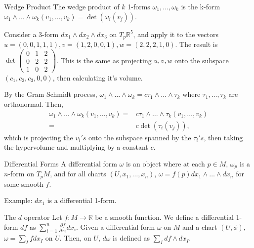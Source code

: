 \documentclass[9pt]{beamer}
\DeclareMathOperator{\Det}{det}
\begin{document}
\begin{frame}
    \begin{block}{Wedge Product}
        The wedge product of $k$ 1-forms $\omega_1, \dots, \omega_k$ is the k-form $\omega_1\wedge\dots\wedge\omega_k(v_1, \dots, v_k)=\Det(\omega_i(v_j))$.
    \end{block}
    Consider a 3-form $dx_1\wedge dx_2\wedge dx_3$ on $T_p\mathbb{R}^5$, and apply it to the vectors $u=(0,0,1,1,1), v=(1,2,0,0,1), w=(2,2,2,1,0)$. The result is $\Det\begin{pmatrix} 0 & 1 & 2 \\
        0 & 2 & 2 \\
        1 & 0 & 2
    \end{pmatrix}$. This is the same as projecting $u,v,w$ onto the subspace ${(c_1,c_2,c_3,0,0)}$, then calculating it's volume.

    By the Gram Schmidt process, $\omega_1\wedge\dots\wedge\omega_k=c\tau_1\wedge \dots\wedge\tau_k$ where $\tau_1,\dots,\tau_k$ are orthonormal. Then, \begin{align*}\omega_1\wedge\dots\wedge\omega_k(v_1,\dots,v_k)=&c\tau_1\wedge \dots\wedge\tau_k(v_1,\dots,v_k)\\=&c\Det(\tau_i(v_j)),\end{align*} which is projecting the $v_i's$ onto the subspace spanned by the $\tau_i's$, then taking the hypervolume and multiplying by a constant $c$.
    

\end{frame}

\begin{frame}
    \begin{block}{Differential Forms}
        A differential form $\omega$ is an object where at each $p\in M$, $\omega_p$ is a $n$-form on $T_pM$, and for all charts $(U, x_1, \dots, x_n)$, $\omega=f(p)dx_1\wedge\dots\wedge dx_n$ for some smooth $f$.
    \end{block}

    Example: $dx_1$ is a differential 1-form.

    \begin{block}{The $d$ operator}
        Let $f:M\rightarrow \mathbb{R}$ be a smooth function. We define a differential 1-form $df$ as $\sum_{i=1}^n \frac{\partial f}{\partial x_i}dx_i$.
        Given a differential form $\omega$ on $M$ and a chart $(U, \phi)$, $\omega=\sum_I f dx_I$ on $U$. Then, on $U$, $d\omega$ is defined as $\sum_I df\wedge dx_I$.
    \end{block}

\end{frame}
\end{document}
